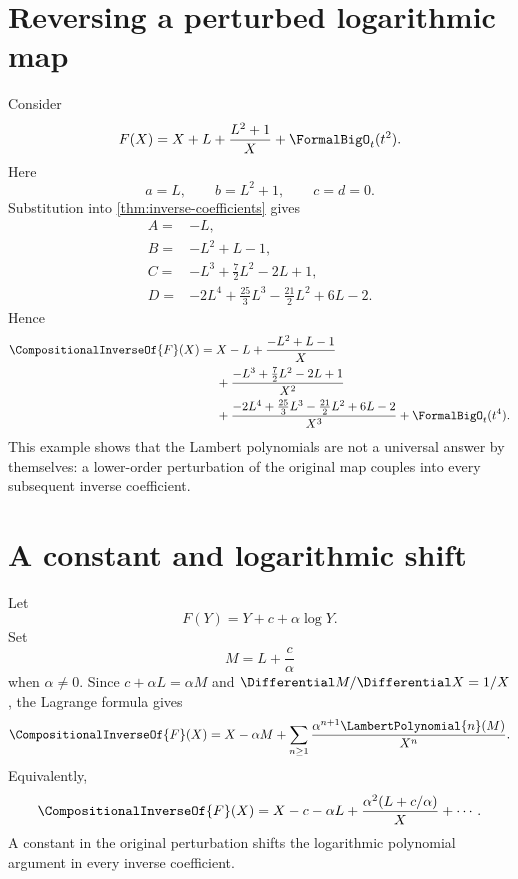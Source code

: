 \documentclass[11pt,openany]{book}
\theoremstyle{definition}
\theoremstyle{plain}
\theoremstyle{remark}
\newcommand{\rev}[1]{\CompositionalInverseOf{#1}}
\begin{document}
\section{Reversing a perturbed logarithmic map}
Consider
\begin{equation}\label{eq:worked-F-perturbed}
 F(X)=X+L+\frac{L^2+1}{X}+\FormalBigO_t(t^2).
\end{equation}
Here
\[
 a=L,
 \qquad b=L^2+1,
 \qquad c=d=0.
\]
Substitution into \cref{thm:inverse-coefficients} gives
\begin{align*}
 A={}&-L,\\
 B={}&-L^2+L-1,\\
 C={}&-L^3+\frac72L^2-2L+1,\\
 D={}&-2L^4+\frac{25}{3}L^3-\frac{21}{2}L^2+6L-2.
\end{align*}
Hence
\begin{equation}\label{eq:worked-inverse-perturbed}
\begin{split}
 \rev F(X)={}&X-L+\frac{-L^2+L-1}{X}\\
 &+\frac{-L^3+\tfrac72L^2-2L+1}{X^2}\\
 &+\frac{-2L^4+\tfrac{25}{3}L^3-\tfrac{21}{2}L^2+6L-2}{X^3}
 +\FormalBigO_t(t^4).
\end{split}
\end{equation}
This example shows that the Lambert polynomials are not a universal answer by
themselves: a lower-order perturbation of the original map couples into every
subsequent inverse coefficient.

\section{A constant and logarithmic shift}
Let
\begin{equation}\label{eq:constant-log-shift}
 F(Y)=Y+c+\alpha\log Y.
\end{equation}
Set
\[
 M=L+\frac c\alpha
\]
when \(\alpha\ne0\).  Since \(c+\alpha L=\alpha M\) and
\(\Differential M/\Differential X=1/X\), the Lagrange formula gives
\begin{equation}\label{eq:constant-log-shift-inverse}
 \rev F(X)
 =X-\alpha M+
 \sum_{n\ge1}\frac{\alpha^{n+1}\LambertPolynomial{n}(M)}{X^n}.
\end{equation}
Equivalently,
\[
 \rev F(X)=X-c-\alpha L
 +\frac{\alpha^2(L+c/\alpha)}X+\cdots.
\]
A constant in the original perturbation shifts the logarithmic polynomial
argument in every inverse coefficient.
\end{document}
